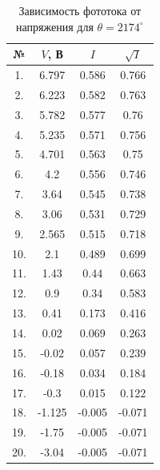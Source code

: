 \documentclass[12pt]{kiarticle}
\begin{document}
		\begin{table}[h!]
		\caption{Зависимость фототока от напряжения для $ \theta = 2174^\circ $}
		\begin{center}
			\begin{tabular}{|c|c|c|c|}
				\hline
				 № & $ V $, В & $ I $ & $ \sqrt{I}  $ \\
				\hline
				 1. & 6.797 & 0.586 & 0.766 \\
				2. & 6.223 & 0.582 & 0.763 \\
				3. & 5.782 & 0.577 & 0.76 \\
				4. & 5.235 & 0.571 & 0.756 \\
				5. & 4.701 & 0.563 & 0.75 \\
				6. & 4.2 & 0.556 & 0.746 \\
				7. & 3.64 & 0.545 & 0.738 \\
				8. & 3.06 & 0.531 & 0.729 \\
				9. & 2.565 & 0.515 & 0.718 \\
				10. & 2.1 & 0.489 & 0.699 \\
				11. & 1.43 & 0.44 & 0.663 \\
				12. & 0.9 & 0.34 & 0.583 \\
				13. & 0.41 & 0.173 & 0.416 \\
				14. & 0.02 & 0.069 & 0.263 \\
				15. & -0.02 & 0.057 & 0.239 \\
				16. & -0.18 & 0.034 & 0.184 \\
				17. & -0.3 & 0.015 & 0.122 \\
				18. & -1.125 & -0.005 & -0.071 \\
				19. & -1.75 & -0.005 & -0.071 \\
				20. & -3.04 & -0.005 & -0.071 \\
				\hline 
			\end{tabular} 
		\end{center}
		\label{}
	\end{table}
\end{document}
